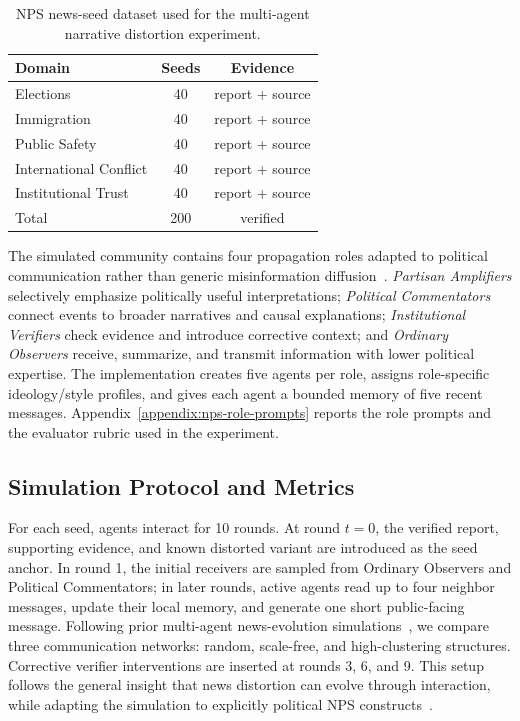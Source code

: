 \begin{table}[t]
\centering
\small
\setlength{\tabcolsep}{3.5pt}
\begin{tabular}{lcc}
\toprule
\textbf{Domain} & \textbf{Seeds} & \textbf{Evidence} \\
\midrule
Elections & 40 & report + source \\
Immigration & 40 & report + source \\
Public Safety & 40 & report + source \\
International Conflict & 40 & report + source \\
Institutional Trust & 40 & report + source \\
\midrule
Total & 200 & verified \\
\bottomrule
\end{tabular}
\caption{NPS news-seed dataset used for the multi-agent narrative distortion experiment.}
\label{tab:nps-data}
\end{table}

The simulated community contains four propagation roles adapted to political communication rather than generic misinformation diffusion~\cite{liu2025stepwisedeception}. \emph{Partisan Amplifiers} selectively emphasize politically useful interpretations; \emph{Political Commentators} connect events to broader narratives and causal explanations; \emph{Institutional Verifiers} check evidence and introduce corrective context; and \emph{Ordinary Observers} receive, summarize, and transmit information with lower political expertise. The implementation creates five agents per role, assigns role-specific ideology/style profiles, and gives each agent a bounded memory of five recent messages. Appendix~\ref{appendix:nps-role-prompts} reports the role prompts and the evaluator rubric used in the experiment.

\subsection{Simulation Protocol and Metrics}
\label{sec:nps-protocol}

For each seed, agents interact for 10 rounds. At round $t=0$, the verified report, supporting evidence, and known distorted variant are introduced as the seed anchor. In round 1, the initial receivers are sampled from Ordinary Observers and Political Commentators; in later rounds, active agents read up to four neighbor messages, update their local memory, and generate one short public-facing message. Following prior multi-agent news-evolution simulations~\cite{liu2025stepwisedeception}, we compare three communication networks: random, scale-free, and high-clustering structures. Corrective verifier interventions are inserted at rounds 3, 6, and 9. This setup follows the general insight that news distortion can evolve through interaction, while adapting the simulation to explicitly political NPS constructs~\cite{liu2025stepwisedeception,boji2025agentpolarization}.

